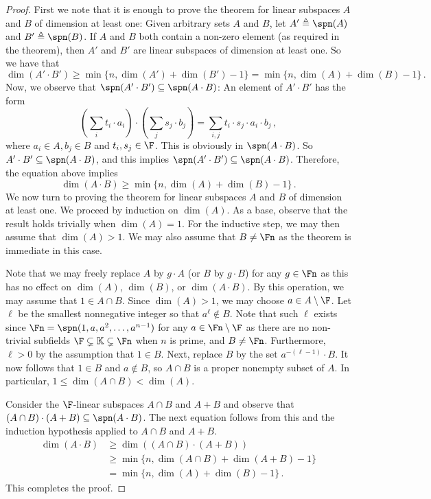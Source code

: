 \begin{proof}
First we note that it is enough to prove the theorem for linear subspaces $A$ and
$B$ of dimension at least one:
Given arbitrary sets $A$ and $B$, let $A'\triangleq\spn(A)$ and $B'\triangleq\spn(B)$.
If $A$ and $B$ both contain a non-zero element (as required in the theorem), then $A'$ and $B'$ are linear subspaces
of dimension at least one. So we have that
\[\dim(A'\cdot B')\geq \min\{n,\dim(A')+\dim(B') -1\} = \min\{n,\dim(A)+\dim(B) -1 \}\,.\]
Now, we observe that $\spn(A'\cdot B')\subseteq \spn(A\cdot B)$: An element of $A' \cdot B'$ has the
form
\[(\sum_i t_i\cdot a_i )\cdot( \sum_j s_j\cdot b_j)=\sum_{i,j} t_i\cdot s_j\cdot a_i\cdot b_j\,,\]
where $a_i\in A,b_j\in B$ and $t_i,s_j\in \F$. This is obviously in $\spn(A\cdot B)$.
So $A'\cdot B'\subseteq \spn(A\cdot B)$, and this implies $\spn(A'\cdot B')\subseteq \spn(A\cdot B)$.
Therefore, the equation above implies
\[\dim(A\cdot B)\geq \min\{n,\dim(A)+\dim(B) -1 \}\,.\]
We now turn to proving the theorem for linear subspaces $A$ and $B$ of dimension at least one.
We proceed by induction on $\dim(A)$.  As a base, observe that the
result holds trivially when $\dim(A) = 1$.  For the inductive step, we
may then assume that $\dim(A) >1$.  We may also assume that $B \neq
\Fn$ as the theorem is immediate in this case.

Note that we may freely replace $A$ by $g\cdot A$ (or $B$ by
$g\cdot B$) for any $g \in \Fn$ as this has no effect on $\dim(A)$, $\dim(B)$, or
$\dim(A \cdot B)$.  By this operation, we may assume that $1 \in A \cap
B$.
Since $\dim(A) > 1$, we may choose $a \in A \setminus \F$.  Let $\ell$ be the
smallest nonnegative integer so that $a^{\ell} \not\in B$. Note that such $\ell$ exists
since $\Fn = \spn(1,a,a^2,\ldots,a^{n-1})$ for any $a \in \Fn \setminus \F$
as there are no non-trivial subfields $\F\subsetneq \mathbb{K} \subsetneq \Fn$ when $n$ is prime, and  $B \neq \Fn$. Furthermore, $\ell > 0$ by the assumption that $1 \in B$.  Next, replace $B$
by the set $a^{-(\ell -  1)}\cdot B$.  It now follows that $1 \in B$ and $a
\not\in B$, so $A \cap B$ is a proper nonempty subset of $A$.
In particular, $1\leq \dim(A\cap B) < \dim(A)$.


Consider the $\F$-linear subspaces $A \cap B$ and $A+B$ and observe
that $(A \cap B) \cdot (A + B) \subseteq \spn(A \cdot B)$.
 The next
equation follows from this and the induction hypothesis applied to $A \cap B$ and $A
+B$.
\begin{align*}
 \dim(A\cdot B) &\ge \dim( (A \cap B) \cdot (A + B)) \\
 &\ge \min\{n,\dim(A\cap B)+\dim(A+B) -1\} \\
 &= \min\{n,\dim(A) + \dim(B) - 1\}\,.
\end{align*}
This completes the proof.
\end{proof}
